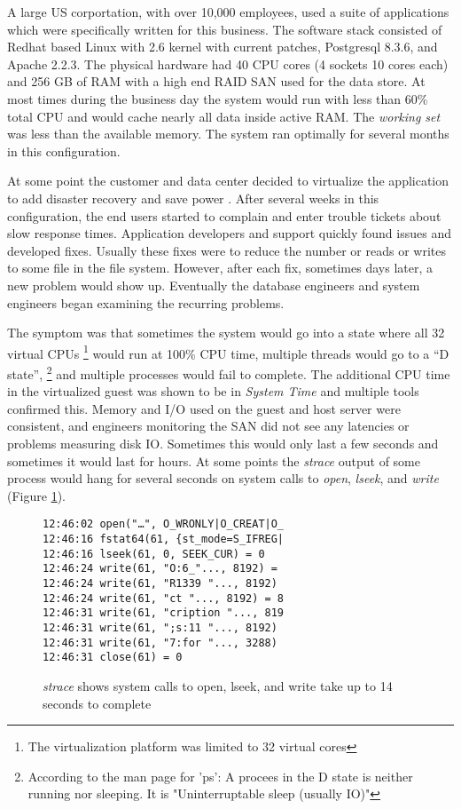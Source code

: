 A large US corportation, with over 10,000 employees, used a suite of applications which were specifically written for this business. The software stack consisted of Redhat based Linux with 2.6 kernel with current patches, Postgresql 8.3.6, and Apache 2.2.3.  The physical hardware had 40 CPU cores (4 sockets 10 cores each) and 256 GB of RAM with a high end RAID SAN used for the data store.  At most times during the business day the system would run with less than 60\% total CPU and would cache nearly all data inside active RAM.  The \emph{working set} was less than the available memory.  The system ran optimally for several months in this configuration.

\indent At some point the customer and data center decided to virtualize the application to add disaster recovery \cite{wood} and save power \cite{lim}.  After several weeks in this configuration, the end users started to complain and enter trouble tickets about slow response times.  Application developers and support quickly found issues and developed fixes.   Usually these fixes were to reduce the number or reads or writes to some file in the file system.  However, after each fix, sometimes days later, a new problem would show up.  Eventually the database engineers and system engineers began examining the recurring problems.

\indent The symptom was that sometimes the system would go into a state where all 32 virtual CPUs \footnote{The virtualization platform was limited to 32 virtual cores} would run at 100\% CPU time, multiple threads would go to a “D state”, \footnote{According to the man page for 'ps':  A procees in the D state is neither running nor sleeping.  It is "Uninterruptable sleep (usually IO)"} and multiple processes would fail to complete.  The additional CPU time in the virtualized guest was shown to be in \emph{System Time} and multiple tools confirmed this.  Memory and I/O used on the guest and host server were consistent, and engineers monitoring the SAN did not see any latencies or problems measuring disk IO.  Sometimes this would only last a few seconds and sometimes it would last for hours. At some points the \emph{strace} output of some process would hang for several seconds on system calls to \emph{open}, \emph{lseek}, and \emph{write} (Figure \ref{fig:syscall}).

\begin{figure}[h]
\begin{Verbatim}
12:46:02 open("…", O_WRONLY|O_CREAT|O_
12:46:16 fstat64(61, {st_mode=S_IFREG| 
12:46:16 lseek(61, 0, SEEK_CUR) = 0 
12:46:24 write(61, "O:6_"..., 8192) =  
12:46:24 write(61, "R1339 "..., 8192)  
12:46:24 write(61, "ct "..., 8192) = 8 
12:46:31 write(61, "cription "..., 819  
12:46:31 write(61, ";s:11 "..., 8192)  
12:46:31 write(61, "7:for "..., 3288)  
12:46:31 close(61) = 0
\end{Verbatim}
\label{fig:syscall}
\caption{\emph{strace} shows system calls to open, lseek, and write take up to 14 seconds to complete}
\end{figure}

